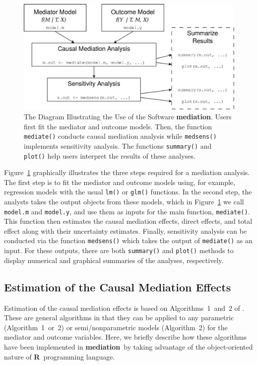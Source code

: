 \documentclass[11pt,letterpaper]{article}
\theoremstyle{plain}
\newcommand\bR{{\bf R}}
\newcommand\bmediation{{\bf mediation}}
\begin{document}
\begin{figure}[t]
  \begin{center}
    \includegraphics[scale=.35]{mediation-chart.jpg}
  \end{center}
  \caption{The Diagram Illustrating the Use of the Software
    \bmediation.  Users first fit the mediator and outcome models.
    Then, the function {\tt mediate()} conducts causal mediation
    analysis while {\tt medsens()} implements sensitivity analysis.  The
    functions {\tt summary()} and {\tt plot()} help users interpret the
    results of these analyses.} \label{fg:chart}
\end{figure}

Figure~\ref{fg:chart} graphically illustrates the three steps required
for a mediation analysis. The first step is to fit the mediator and
outcome models using, for example, regression models with the usual
\texttt{lm()} or \texttt{glm()} functions. In the second step, the
analysts takes the output objects from these models, which in
Figure~\ref{fg:chart} we call {\tt model.m} and {\tt model.y}, and use
them as inputs for the main function, {\tt mediate()}. This function
then estimates the causal mediation effects, direct effects, and total
effect along with their uncertainty estimates. Finally, sensitivity
analysis can be conducted via the function {\tt medsens()} which takes
the output of {\tt mediate()} as an input.  For these outputs, 
there are both {\tt summary()} and {\tt plot()} methods to
display numerical and graphical summaries of the analyses,
respectively.

\subsection{Estimation of the Causal Mediation Effects}

Estimation of the causal mediation effects is based on
Algorithms~1~and~2 of \citet{imai:keel:ting:10}. These are general
algorithms in that they can be applied to any parametric
(Algorithm~1~or~2) or semi/nonparametric models (Algorithm~2) for the
mediator and outcome variables.  Here, we briefly describe how these
algorithms have been implemented in \bmediation\ by taking advantage
of the object-oriented nature of \bR\ programming language.
\end{document}
